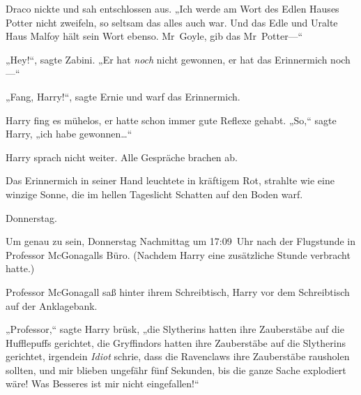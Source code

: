 Draco nickte und sah entschlossen aus. „Ich werde am Wort des Edlen Hauses Potter nicht zweifeln, so seltsam das alles auch war. Und das Edle und Uralte Haus Malfoy hält sein Wort ebenso. Mr~Goyle, gib das Mr~Potter—“

„Hey!“, sagte Zabini. „Er hat \emph{noch} nicht gewonnen, er hat das Erinnermich noch—“

„Fang, Harry!“, sagte Ernie und warf das Erinnermich.

Harry fing es mühelos, er hatte schon immer gute Reflexe gehabt. „So,“ sagte Harry, „ich habe gewonnen…“

Harry sprach nicht weiter. Alle Gespräche brachen ab.

Das Erinnermich in seiner Hand leuchtete in kräftigem Rot, strahlte wie eine winzige Sonne, die im hellen Tageslicht Schatten auf den Boden warf.

\later

Donnerstag.

Um genau zu sein, Donnerstag Nachmittag um 17:09~Uhr nach der Flugstunde in Professor McGonagalls Büro. (Nachdem Harry eine zusätzliche Stunde verbracht hatte.)

Professor McGonagall saß hinter ihrem Schreibtisch, Harry vor dem Schreibtisch auf der Anklagebank.

„Professor,“ sagte Harry brüsk, „die Slytherins hatten ihre Zauberstäbe auf die Hufflepuffs gerichtet, die Gryffindors hatten ihre Zauberstäbe auf die Slytherins gerichtet, irgendein \emph{Idiot} schrie, dass die Ravenclaws ihre Zauberstäbe rausholen sollten, und mir blieben ungefähr fünf Sekunden, bis die ganze Sache explodiert wäre! Was Besseres ist mir nicht eingefallen!“

